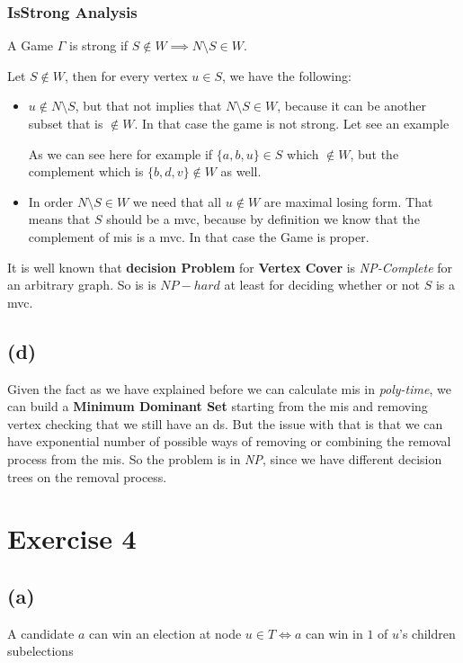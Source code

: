 \documentclass[12pt, a4paper]{article}
\begin{document}
\subsubsection{IsStrong Analysis}
A Game $\Gamma$ is strong if $S \notin W \implies N \setminus S \in W$.

Let $S \notin W$, then for every vertex $u \in S$, we have the following:
\begin{itemize}
  \item $u \notin N \setminus S$, but that not implies that $N \setminus S \in W$, because it can be another subset that is $\notin W$.
  In that case the game is not strong. Let see an example


  As we can see here for example if $\{a,b,u\} \in S$ which $\notin W$, but the complement which is $\{b,d,v\} \notin W$ as well.

  \item In order $N \setminus S \in W$ we need that all $u \notin W$ are maximal losing form. That means that $S$ should be a \acrfull{mvc},
  because by definition we know that the complement of \acrlong{mis} is a \acrlong{mvc}. In that case the Game is proper.
\end{itemize}

It is well known that \textbf{decision Problem} for \textbf{Vertex Cover} is \textit{NP-Complete} for an arbitrary graph.
So \acrlong{is} is $NP-hard$ at least for deciding whether or not $S$ is a \acrlong{mvc}.

\subsection{(d)}
Given the fact as we have explained before we can calculate \acrfull{mis} in \textit{poly-time}, 
we can build a \textbf{Minimum Dominant Set} starting from the \acrshort{mis} and removing vertex checking that we still have
an \acrlong{ds}. 
But the issue with that is that we can have exponential number of possible ways of removing or combining the removal process from the \acrlong{mis}.
So the problem is in \textit{NP}, since we have different decision trees on the removal process.

\section{Exercise 4}
\subsection{(a)}
A candidate $a$ can win an election at node $u \in T \iff a$ can win in $1$ of $u$'s children subelections




\end{document}
